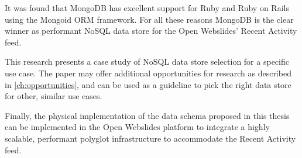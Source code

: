 It was found that MongoDB has excellent support for Ruby and Ruby on Rails using the Mongoid ORM framework.
For all these reasons MongoDB is the clear winner as performant NoSQL data store for the Open Webslides' Recent Activity feed.

This research presents a case study of NoSQL data store selection for a specific use case.
The paper may offer additional opportunities for research as described in \cref{ch:opportunities}, and can be used as a guideline to pick the right data store for other, similar use cases.

Finally, the physical implementation of the data schema proposed in this thesis can be implemented in the Open Webslides platform to integrate a highly scalable, performant polyglot infrastructure to accommodate the Recent Activity feed.
